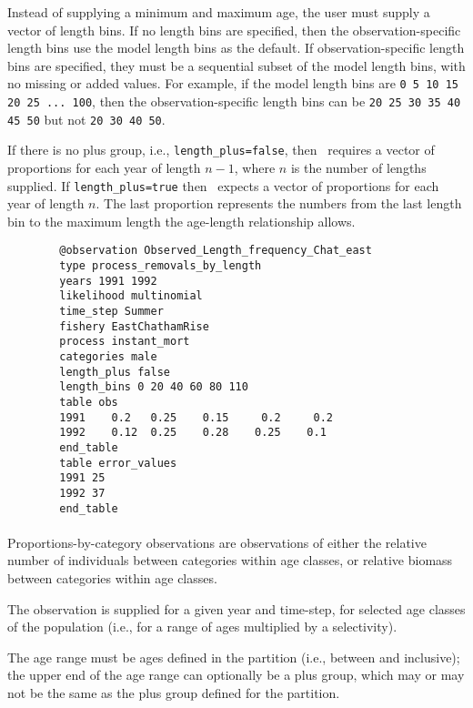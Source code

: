 Instead of supplying a minimum and maximum age, the user must supply a vector of length bins. If no length bins are specified, then the observation-specific length bins use the model length bins as the default. If observation-specific length bins are specified, they must be a sequential subset of the model length bins, with no missing or added values. For example, if the model length bins are \texttt{0 5 10 15 20 25 ... 100}, then the observation-specific length bins can be \texttt{20 25 30 35 40 45 50} but not \texttt{20 30 40 50}.

If there is no plus group, i.e., \texttt{length\_plus=false}, then \CNAME\ requires a vector of proportions for each year of length $n - 1$, where $n$ is the number of lengths supplied. If \texttt{length\_plus=true} then \CNAME\ expects a vector of proportions for each year of length $n$. The last proportion represents the numbers from the last length bin to the maximum length the age-length relationship allows.

{\small{\begin{verbatim}
		@observation Observed_Length_frequency_Chat_east
		type process_removals_by_length
		years 1991 1992
		likelihood multinomial
		time_step Summer
		fishery EastChathamRise
		process instant_mort
		categories male
		length_plus false
		length_bins 0 20 40 60 80 110
		table obs
		1991    0.2   0.25    0.15     0.2     0.2
		1992    0.12  0.25    0.28    0.25    0.1
		end_table
		table error_values
		1991 25
		1992 37
		end_table
		\end{verbatim}}}


\paragraph*{}\label{sec:Observation-ProportionsByCategory}


Proportions-by-category observations are observations of either the relative number of individuals between categories within age classes, or relative biomass between categories within age classes.

The observation is supplied for a given year and time-step, for selected age classes of the population (i.e., for a range of ages multiplied by a selectivity).

The age range must be ages defined in the partition (i.e., between  and  inclusive); the upper end of the age range can optionally be a plus group, which may or may not be the same as the plus group defined for the partition.

